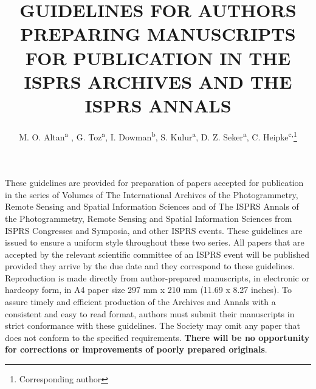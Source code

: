 \documentclass{isprs}
\begin{document}
\title{GUIDELINES FOR AUTHORS PREPARING MANUSCRIPTS FOR PUBLICATION IN THE ISPRS ARCHIVES AND THE ISPRS ANNALS}

\author{
 M. O. Altan\textsuperscript{a}
 , G. Toz\textsuperscript{a}, I. Dowman\textsuperscript{b}, S. Kulur\textsuperscript{a}, D. Z. Seker\textsuperscript{a}, C. Heipke\textsuperscript{c,}\thanks{Corresponding author}}

\address
{
	\textsuperscript{a }ITU, Civil Engineering Faculty, 80626 Maslak Istanbul, Turkey - (oaltan, tozg, kulur, seker)@itu.edu.tr\\
	\textsuperscript{b }Dept. of Geomatic Engineering, University College London, Gower Street, London, WC1E 6BT UK - idowman@ge.ucl.ac.uk\\
	\textsuperscript{c }Institute of Photogrammetry and GeoInformation, Leibniz Universit\"at Hannover, Germany - \\
	heipke@ipi.uni-hannover.de
}

\icwg{}   %

\abstract
{
These guidelines are provided for preparation of papers accepted for publication in the series of Volumes of The International Archives of the Photogrammetry, Remote Sensing and Spatial Information Sciences and of The ISPRS Annals of the Photogrammetry, Remote Sensing and Spatial Information Sciences from ISPRS Congresses and Symposia, and other ISPRS events.  These guidelines are issued to ensure a uniform style throughout these two series. All papers that are accepted by the relevant scientific committee of an ISPRS event will be published provided they arrive by the due date and they correspond to these guidelines. Reproduction is made directly from author-prepared manuscripts, in electronic or hardcopy form, in A4 paper size 297 mm x 210 mm (11.69 x 8.27 inches). To assure timely and efficient production of the Archives and Annals with a consistent and easy to read format, authors must submit their manuscripts in strict conformance with these guidelines. The Society may omit any paper that does not conform to the specified requirements. \textbf{There will be no opportunity for corrections or improvements of poorly prepared originals}.
}


\maketitle
\end{document}
